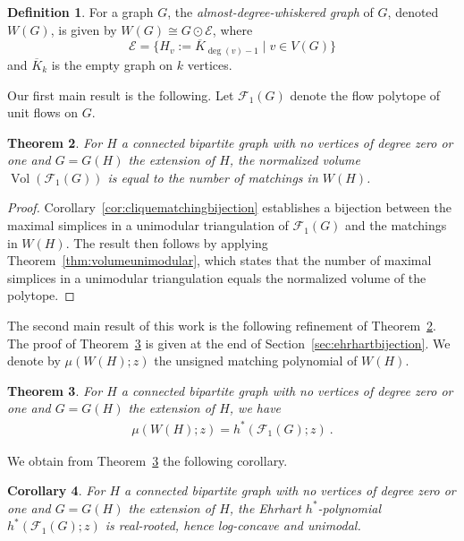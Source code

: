 \documentclass[12pt]{amsart}
\newtheorem{theorem}{Theorem}[section]
\newtheorem{corollary}[theorem]{Corollary}
\theoremstyle{definition}
\newtheorem{definition}[theorem]{Definition}
\newcommand\calF{\mathcal{F}}
\DeclareMathOperator{\vol}{Vol}
\begin{document}
\begin{definition}
For a graph $G$, the \emph{almost-degree-whiskered graph} of $G$, denoted $W(G)$, is given by $W(G) \cong G \odot \mathcal{E}$, where
\[
    \mathcal{E} = \{ H_v:=\overline{K}_{\deg(v)-1} \mid v \in V(G)\}
\]
and $\overline{K}_k$ is the empty graph on $k$ vertices.
\end{definition}

Our first main result is the following.
Let $\calF_1(G)$ denote the flow polytope of unit flows on $G$.

\begin{theorem}\label{thm:volumeequalsmatching}
For $H$ a connected bipartite graph with no vertices of degree zero or one and $G=G(H)$ the extension of $H$, the normalized volume $\vol(\calF_1(G))$ is equal to the number of matchings in $W(H)$.
\end{theorem}

\begin{proof}
Corollary~\ref{cor:cliquematchingbijection} establishes a bijection between the maximal simplices in a unimodular triangulation of $\calF_1(G)$ and the matchings in $W(H)$.
The result then follows by applying Theorem~\ref{thm:volumeunimodular}, which states that the number of maximal simplices in a unimodular triangulation equals the normalized volume of the polytope.
\end{proof}

The second main result of this work is the following refinement of Theorem~\ref{thm:volumeequalsmatching}.
The proof of Theorem~\ref{thm:matchingequalshstar} is given at the end of Section~\ref{sec:ehrhartbijection}.
We denote by $\mu(W(H);z)$ the unsigned matching polynomial of $W(H)$.

\begin{theorem}\label{thm:matchingequalshstar}
For $H$ a connected bipartite graph with no vertices of degree zero or one and $G=G(H)$ the extension of $H$, we have
\begin{align*}
    \mu(W(H);z) = h^*(\calF_1(G);z)\ .
\end{align*}
\end{theorem}

We obtain from Theorem~\ref{thm:matchingequalshstar} the following corollary.

\begin{corollary}\label{cor:hstarrealrooted}
For $H$ a connected bipartite graph with no vertices of degree zero or one and $G=G(H)$ the extension of $H$, the Ehrhart $h^*$-polynomial $h^*(\calF_1(G);z)$ is real-rooted, hence log-concave and unimodal.
\end{corollary}
\end{document}
